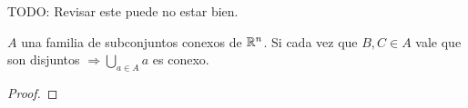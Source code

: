 TODO: Revisar este puede no estar bien.
\begin{prop}
  $A$ una familia de subconjuntos conexos de $\mathbb{R}^n$. Si cada vez que $B, C \in A$ vale que son disjuntos $\Rightarrow \bigcup_{a \in A} a$ es conexo.
  \begin{proof}

  \end{proof}
\end{prop}
